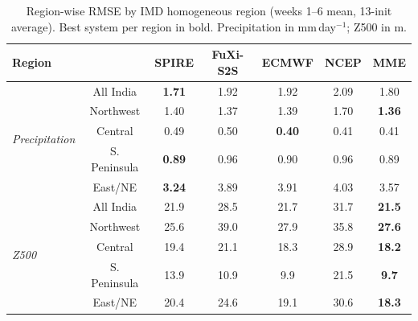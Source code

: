 \documentclass[11pt]{article}
\begin{document}
\begin{table}[t]\centering
\small
\setlength{\tabcolsep}{5pt}
\caption{Region-wise RMSE by IMD homogeneous region (weeks 1--6 mean,
13-init average). Best system per region in bold. Precipitation in
mm\,day$^{-1}$; Z500 in m.}\label{tab:reg_rmse}
\begin{tabular}{lcccccc}\toprule
Region & & SPIRE & FuXi-S2S & ECMWF & NCEP & MME \\
\midrule
\multirow{5}{*}{\emph{Precipitation}} &
All India    & \textbf{1.71} & 1.92 & 1.92 & 2.09 & 1.80 \\
& Northwest    & 1.40 & 1.37 & 1.39 & 1.70 & \textbf{1.36} \\
& Central      & 0.49 & 0.50 & \textbf{0.40} & 0.41 & 0.41 \\
& S. Peninsula & \textbf{0.89} & 0.96 & 0.90 & 0.96 & 0.89 \\
& East/NE      & \textbf{3.24} & 3.89 & 3.91 & 4.03 & 3.57 \\
\midrule
\multirow{5}{*}{\emph{Z500}} &
All India    & 21.9 & 28.5 & 21.7 & 31.7 & \textbf{21.5} \\
& Northwest    & 25.6 & 39.0 & 27.9 & 35.8 & \textbf{27.6} \\
& Central      & 19.4 & 21.1 & 18.3 & 28.9 & \textbf{18.2} \\
& S. Peninsula & 13.9 & 10.9 & 9.9  & 21.5 & \textbf{9.7} \\
& East/NE      & 20.4 & 24.6 & 19.1 & 30.6 & \textbf{18.3} \\
\bottomrule
\end{tabular}\end{table}
\end{document}
